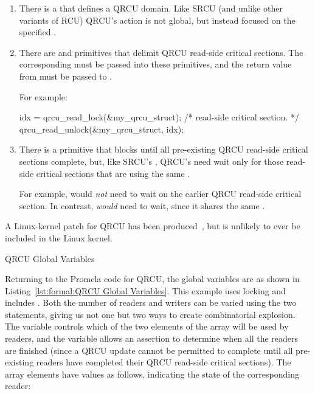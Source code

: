 \begin{enumerate}
\item	There is a  that defines a QRCU domain.
	Like SRCU (and unlike other variants of RCU) QRCU's action
	is not global, but instead focused on the specified
	.
\item	There are  and 
	primitives that delimit QRCU read-side critical sections.
	The corresponding  must be passed into
	these primitives, and the return value from 
	must be passed to .

	For example:

\begin{VerbatimU}
idx = qrcu_read_lock(&my_qrcu_struct);
/* read-side critical section. */
qrcu_read_unlock(&my_qrcu_struct, idx);
\end{VerbatimU}

\item	There is a  primitive that blocks until
	all pre-existing QRCU read-side critical sections complete,
	but, like SRCU's , QRCU's
	 need wait only for those read-side
	critical sections that are using the same .

	For example, 
	would \emph{not} need to wait on the earlier QRCU read-side
	critical section.
	In contrast, 
	\emph{would} need to wait, since it shares the same
	.
\end{enumerate}

A Linux-kernel patch for QRCU has been
produced~\cite{PaulMcKenney2007QRCUpatch},
but is unlikely to ever be included in the Linux kernel.

\begin{listing}[htbp]

\caption{QRCU Global Variables}
\label{lst:formal:QRCU Global Variables}
\end{listing}

Returning to the Promela code for QRCU, the global variables are as shown in
Listing~\ref{lst:formal:QRCU Global Variables}.
This example uses locking and includes .
Both the number of readers and writers can be varied using the
two  statements, giving us not one but two ways to create
combinatorial explosion.
The  variable controls which of the two elements of the 
array will be used by readers, and the  variable
allows an assertion to determine when all the readers are finished
(since a QRCU update cannot be permitted to complete until all
pre-existing readers have completed their QRCU read-side critical
sections).
The  array elements have values as follows,
indicating the state of the corresponding reader:

